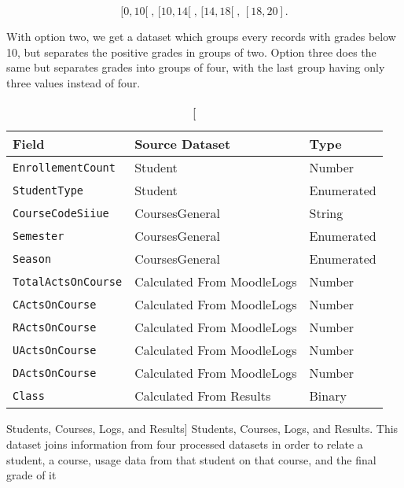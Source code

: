 \[
    [0, 10[\;,\, [10, 14[\;,\, [14, 18[\;,\, [18, 20].
\]

With option two, we get a dataset which groups every records with grades below
10, but separates the positive grades in groups of two. Option three does the
same but separates grades into groups of four, with the last group having only
three values instead of four.

\begin{table}[h!]
    \centering

    \begin{tabular}{| l | l | l |}
        \hline
        \textbf{Field}             & \textbf{Source Dataset}    & \textbf{Type} \\ \hline
        \texttt{EnrollementCount}  & Student                    & Number        \\ \hline
        \texttt{StudentType}       & Student                    & Enumerated    \\ \hline
        \texttt{CourseCodeSiiue}   & CoursesGeneral             & String        \\ \hline
        \texttt{Semester}          & CoursesGeneral             & Enumerated    \\ \hline
        \texttt{Season}            & CoursesGeneral             & Enumerated    \\ \hline
        \texttt{TotalActsOnCourse} & Calculated From MoodleLogs & Number        \\ \hline
        \texttt{CActsOnCourse}     & Calculated From MoodleLogs & Number        \\ \hline
        \texttt{RActsOnCourse}     & Calculated From MoodleLogs & Number        \\ \hline
        \texttt{UActsOnCourse}     & Calculated From MoodleLogs & Number        \\ \hline
        \texttt{DActsOnCourse}     & Calculated From MoodleLogs & Number        \\ \hline
        \texttt{Class}             & Calculated From Results    & Binary        \\ \hline
    \end{tabular}

    \caption
        [Students, Courses, Logs, and Results]
        {Students, Courses, Logs, and Results. This dataset joins information
        from four processed datasets in order to relate a student, a course,
        usage data from that student on that course, and the final grade of it}

    \label{tab:dat_001}
\end{table}

